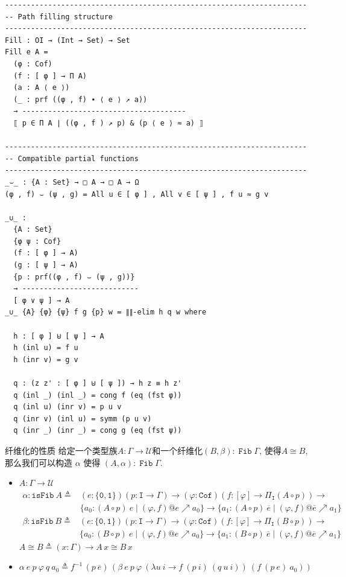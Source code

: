 \documentclass[aspectratio=169,xcolor=dvipsnames]{beamer}
\newcommand\calU{\mathcal{U}}
\newcommand\isFib{\mathtt{isFib}}
\newcommand\ttI{\mathtt{I}}
\newcommand\ttzero{\mathtt{0}}
\newcommand\ttone{\mathtt{1}}
\newcommand\Cof{\mathtt{Cof}}
\DeclareMathOperator\Fib{\mathtt{Fib}}
\begin{document}
\begin{frame}
\begin{verbatim}
----------------------------------------------------------------------
-- Path filling structure
----------------------------------------------------------------------
Fill : OI → (Int → Set) → Set
Fill e A =
  (φ : Cof)
  (f : [ φ ] → Π A)
  (a : A ⟨ e ⟩)
  (_ : prf ((φ , f) ∙ ⟨ e ⟩ ↗ a))
  → --------------------------------------
  ⟦ p ∈ Π A ∣ ((φ , f ) ↗ p) & (p ⟨ e ⟩ ≈ a) ⟧

----------------------------------------------------------------------
-- Compatible partial functions
----------------------------------------------------------------------
_⌣_ : {A : Set} → □ A → □ A → Ω
(φ , f) ⌣ (ψ , g) = All u ∈ [ φ ] , All v ∈ [ ψ ] , f u ≈ g v

_∪_ :
  {A : Set}
  {φ ψ : Cof}
  (f : [ φ ] → A)
  (g : [ ψ ] → A)
  {p : prf((φ , f) ⌣ (ψ , g))}
  → ---------------------------
  [ φ ∨ ψ ] → A
_∪_ {A} {φ} {ψ} f g {p} w = ∥∥-elim h q w where

  h : [ φ ] ⊎ [ ψ ] → A
  h (inl u) = f u
  h (inr v) = g v

  q : (z z' : [ φ ] ⊎ [ ψ ]) → h z ≡ h z'
  q (inl _) (inl _) = cong f (eq (fst φ))
  q (inl u) (inr v) = p u v
  q (inr v) (inl u) = symm (p u v)
  q (inr _) (inr _) = cong g (eq (fst ψ))
\end{verbatim}
\end{frame}

\begin{frame}{纤维化的性质}
  给定一个类型族$A:\Gamma\to\calU$和一个纤维化$(B,\beta):\Fib\Gamma$, 使得$A\cong B$, 那么我们可以构造 $\alpha$ 使得 $(A,\alpha):\Fib\Gamma$.
  \begin{itemize}
    \item $A:\Gamma\to\calU$
     \begin{align*}
      \alpha :\isFib\ A \triangleq &(e:\{\ttzero,\ttone\})(p:\ttI\to\Gamma)\to(\varphi:\Cof)(f:[\varphi]\to\Pi_{\ttI}(A\circ p))\to\\
      &\{a_0:(A\circ p)\ e\mid(\varphi,f)@e\nearrow a_0\}\to\{a_1:(A\circ p)\ \overline{e}\mid(\varphi,f)@\overline{e}\nearrow a_1\}\end{align*}
       \begin{align*}
      \beta :\isFib\ B \triangleq &(e:\{\ttzero,\ttone\})(p:\ttI\to\Gamma)\to(\varphi:\Cof)(f:[\varphi]\to\Pi_{\ttI}(B\circ p))\to\\
      &\{a_0:(B\circ p)\ e\mid(\varphi,f)@e\nearrow a_0\}\to\{a_1:(B\circ p)\ \overline{e}\mid(\varphi,f)@\overline{e}\nearrow a_1\}\end{align*}
      $A \cong B \triangleq (x : \Gamma) \to A\,x \cong B\,x$
    \item $\alpha\ e\ p\ \varphi\ q\ a_0\triangleq f^{-1}\,(p\ \overline{e})\,(\beta\ e\ p\ \varphi\ (\lambda u\ i\to f\ (p\ i)\ (q\ u\ i))\ (f\ (p\ e)\ a_0))$
  \end{itemize}
\end{frame}
\end{document}

